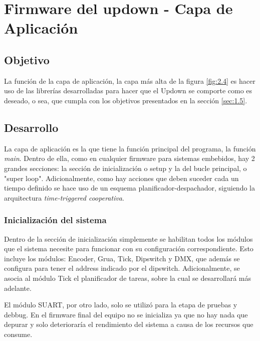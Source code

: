 
\section{Firmware del updown - Capa de Aplicación} \label{sec:\thesection}

\subsection{Objetivo}
La función de la capa de aplicación, la capa más alta de la figura \ref{fig:2.4} es hacer uso de las librerías desarrolladas para hacer que el Updown se comporte como es deseado, o sea, que cumpla con los objetivos presentados en la sección \ref{sec:1.5}.

\subsection{Desarrollo}
La capa de aplicación es la que tiene la función principal del programa, la función \textit{main}. Dentro de ella, como en cualquier firmware para sistemas embebidos, hay 2 grandes secciones: la sección de inicialización o setup y la del bucle principal, o "super loop". Adicionalmente, como hay acciones que deben suceder cada un tiempo definido se hace uso de un esquema planificador-despachador, siguiendo la arquitectura \textit{time-triggered cooperativa}.

\subsubsection{Inicialización del sistema}

Dentro de la sección de inicialización simplemente se habilitan todos los módulos que el sistema necesite para funcionar con su configuración correspondiente. Esto incluye los módulos: Encoder, Grua, Tick, Dipswitch y DMX, que además se configura para tener el address indicado por el dipswitch. Adicionalmente, se asocia al módulo Tick el planificador de tareas, sobre la cual se desarrollará más adelante.

El módulo SUART, por otro lado, solo se utilizó para la etapa de pruebas y debbug. En el firmware final del equipo no se inicializa ya que no hay nada que depurar y solo deterioraría el rendimiento del sistema a causa de los recursos que consume. 

